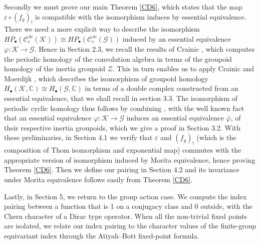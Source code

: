 \documentclass[a4paper]{amsart}
\newcommand{\CC}{\mathbb C}
\newcommand{\maC}{\mathcal C}
\newcommand{\maG}{\mathcal G}
\newcommand{\maK}{\mathcal K}
\newcommand{\maZ}{\mathcal Z}
\newcommand\<{\langle}
\renewcommand\>{\rangle}
\newtheorem{nota}[theorem]{Notations}
\theoremstyle{definition}
\theoremstyle{remark}
\begin{document}
Secondly we must prove our main Theorem \ref{CD6}, which states
that the map $\varepsilon \circ (f_y)_!$ is compatible with the isomorphism induces by essential equivalence.
There we need a more explicit way to describe the isomorphism
$H P _\bullet (\maC^\infty _c (\maK)) \cong H P _\bullet (\maC^\infty _c (\maG))$ induced by an essential equivalence
$\varphi : \maK \to \maG$.
Hence in Section 2.3, we recall the results of Crainic \cite{Crainic;EtaleGpoid},
which computes the periodic homology of the convolution algebra in terms of the groupoid homology of the inertia groupoid $\maZ$.
This in turn enables us to apply Crainic and Moerdijk \cite{Moerdijk;EtaleHomology},
which describes the isomorphism of groupoid homology
$H _\bullet (\maK , \CC) \cong H _\bullet (\maG , \CC)$ in terms of a double complex constructed from an essential equivalence,
that we shall recall in section 3.3.
The isomorphism of periodic cyclic homology thus follows by combining \cite{Moerdijk;EtaleHomology},
with the well known fact that an essential equivalence $\varphi : \maK \to \maG$ induces an essential equivalence $\bar \varphi$,
of their respective inertia groupoids, which we give a proof in Section 3.2.
With these preliminaries,
in Section 4.1 we verify that $\varepsilon $ and $(f_y)_!$ (which is the composition of Thom isomorphism and exponential map)
commutes with the appropriate version of isomorphism induced by Morita equivalence,
hence proving Theorem \ref{CD6}.
Then we define our pairing in Section 4.2 and its invariance under Morita equivalence follows easily from Theorem \ref{CD6}.

Lastly, in Section 5, we return to the group action case.
We compute the index pairing between a function that is 1 on a conjugacy class and 0 outside,
with the Chern character of a Dirac type operator.
When all the non-trivial fixed points are isolated, we relate our index pairing
to the character values of the finite-group equivariant index through the Atiyah--Bott fixed-point formula.


\end{document}
